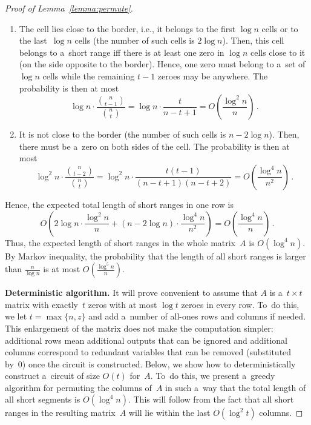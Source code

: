 \begin{proof}[Proof of Lemma~\ref{lemma:permute}]
\begin{enumerate}
\item The cell lies close to the border, i.e., it belongs to
the first $\log n$ cells or to the last~$\log n$ cells
(the number of such cells is $2\log n$). Then,
this cell belongs to a~short range iff there is at least one zero
in $\log n$ cells close to it (on the side opposite to the border).
Hence, one zero must belong to a~set of $\log n$ cells while the remaining
$t-1$ zeroes may be anywhere. The probability is then at most
\[\log n \cdot \frac{\binom{n}{t-1}}{\binom{n}{t}}=\log n \cdot \frac{t}{n-t+1}=O\left(\frac{\log^2n}{n}\right) \, .\]
\item It is not close to the border (the number of such cells is $n-2\log n$).
Then, there must be a~zero on both sides of the cell. The probability is then
at most
\[\log^2 n \cdot \frac{\binom{n}{t-2}}{\binom{n}{t}}=\log^2n \cdot \frac{t(t-1)}{(n-t+1)(n-t+2)}=O\left(\frac{\log^4 n}{n^2}\right) \, .\]
\end{enumerate}
Hence, the expected total length of short ranges in one row is
\[O\left( 2\log n \cdot \frac{\log^2 n}{n} + (n-2\log n) \cdot \frac{\log^4 n}{n^2}\right)=O\left(\frac{\log^4 n}{n}\right) \, .\]
Thus, the expected length of short ranges in the whole
matrix~$A$ is $O(\log^4n)$. By Markov inequality, the probability that
the length of all short ranges is larger than $\frac{n}{\log n}$ is
at most $O(\frac{\log^5 n}{n})$.

\textbf{Deterministic algorithm.}
It will prove convenient to assume that $A$ is a~$t \times t$ matrix with
exactly~$t$ zeros with at most $\log t$ zeroes in every row. To~do this, we let
$t=\max\{n, z\}$ and add a~number of all-ones rows and columns if needed. This
enlargement of the matrix does not make the computation simpler: additional rows
mean additional outputs that can be ignored and additional columns correspond to
redundant variables that can be removed (substituted by~0) once the circuit is
constructed. Below, we show how to deterministically construct a~circuit of size
$O(t)$ for~$A$. To~do this, we present a~greedy algorithm for permuting the
columns of~$A$ in such a~way that the total length of all short segments
is $O(\log^4n)$. This will follow from the fact that all short ranges in the
resulting matrix~$A$ will lie within the last $O(\log^2 t)$ columns.



\end{proof}
